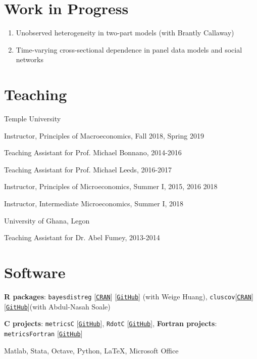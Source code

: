 \documentclass[letterpaper]{article}
\renewenvironment{itemize}{
  \begin{list}{}{
    \setlength{\leftmargin}{1.5em}
  }
}{
  \end{list}
}
\begin{document}
\section*{Work in Progress}
\begin{enumerate}
	\item Unobserved heterogeneity in two-part models (with Brantly Callaway)
	\item Time-varying cross-sectional dependence in panel data models and social networks
\end{enumerate}

\section*{Teaching}
\begin{enumerate}
	\item Temple University
	\begin{itemize}
		\item Instructor, Principles of Macroeconomics, Fall 2018, Spring 2019
		\item Teaching Assistant for Prof. Michael Bonnano, 2014-2016
		\item Teaching Assistant for Prof. Michael Leeds, 2016-2017
		\item Instructor, Principles of Microeconomics, Summer I, 2015, 2016 2018
		\item Instructor, Intermediate Microeconomics, Summer I, 2018
	\end{itemize}
	\item University of Ghana, Legon
	\begin{itemize}
		\item Teaching Assistant for Dr. Abel Fumey, 2013-2014
	\end{itemize}
\end{enumerate}


\section*{Software}
\begin{itemize}
  \item \textbf{R packages}: \texttt{bayesdistreg} [\texttt{\href{https://CRAN.R-project.org/package=bayesdistreg}{CRAN}}] [\texttt{\href{https://estsyawo.github.io/bayesdistreg/}{GitHub}}] (with Weige Huang), \texttt{cluscov}[\texttt{\href{https://CRAN.R-project.org/package=cluscov}{CRAN}}] [\texttt{\href{https://github.com/estsyawo/cluscov}{GitHub}}](with Abdul-Nasah Soale)

  \item \textbf{C projects}: \texttt{metricsC} [\texttt{\href{https://github.com/estsyawo/metricsC}{GitHub}}], \texttt{RdotC} [\texttt{\href{https://github.com/estsyawo/RdotC}{GitHub}}], \textbf{Fortran projects}: \texttt{metricsFortran} [\texttt{\href{https://github.com/estsyawo/metricsFortran}{GitHub}}]
  \item Matlab,  Stata, Octave, Python, \LaTeX, Microsoft Office
\end{itemize}
\end{document}
